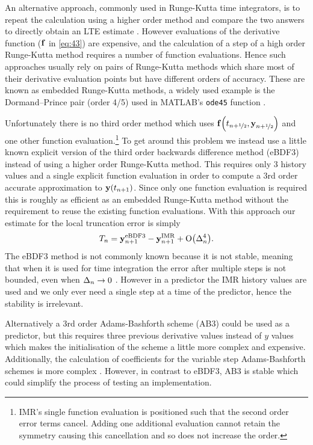 An alternative approach, commonly used in Runge-Kutta time integrators, is to repeat the calculation using a higher order method and compare the two answers to directly obtain an LTE estimate \cite[165]{HairerWanner}.
However evaluations of the derivative function (${\boldsymbol{\mathrm{f}}}$ in \cref{eq:43}) are expensive, and the calculation of a step of a high order Runge-Kutta method requires a number of function evaluations.
Hence such approaches usually rely on pairs of Runge-Kutta methods which share most of their derivative evaluation points but have different orders of accuracy.
These are known as embedded Runge-Kutta methods, a widely used example is the Dormand–Prince pair (order 4/5) used in MATLAB's \texttt{ode45} function \cite{matlab-ode45}.

Unfortunately there is no third order method which uses ${\boldsymbol{\mathrm{f}}{\left( t_{n+\nicefrac{1}{2}}, \boldsymbol{\mathrm{y}}_{n+\nicefrac{1}{2}} \right)}}$ and one other function evaluation.\footnote{IMR's single function evaluation is positioned such that the second order error terms cancel. Adding one additional evaluation cannot retain the symmetry causing this cancellation and so does not increase the order.}
To get around this problem we instead use a little known explicit version of the third order backwards difference method (eBDF3) instead of using a higher order Runge-Kutta method.
This requires only 3 history values and a single explicit function evaluation in order to compute a 3rd order accurate approximation to $\boldsymbol{\mathrm{y}}(t_{n+1})$.
Since only one function evaluation is required this is roughly as efficient as an embedded Runge-Kutta method without the requirement to reuse the existing function evaluations.
With this approach our estimate for the local truncation error is simply
\begin{equation}
  \label{eq:aimr-lte-est}
  T_n = \boldsymbol{\mathrm{y}}_{n+1}^{\mathrm{eBDF3}} - \boldsymbol{\mathrm{y}}_{n+1}^{\mathrm{IMR}} + \mathrm{O}{\left( \Delta_{n}^4 \right)}.
\end{equation}
The eBDF3 method is not commonly known because it is not stable, meaning that when it is used for time integration the error after multiple steps is not bounded, even when $\Delta_{n} \rightarrow 0$ \cite[365]{HairerNorsettWanner}.
However in a predictor the IMR history values are used and we only ever need a single step at a time of the predictor, hence the stability is irrelevant.

Alternatively a 3rd order Adams-Bashforth scheme (AB3) could be used as a predictor, but this requires three previous derivative values instead of $y$ values which makes the initialisation of the scheme a little more complex and expensive.
Additionally, the calculation of coefficients for the variable step Adams-Bashforth schemes is more complex \cite[400]{HairerNorsettWanner}.
However, in contrast to eBDF3, AB3 is stable which could simplify the process of testing an implementation.


